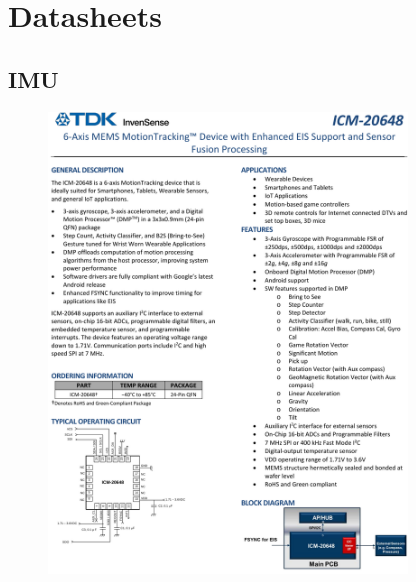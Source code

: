 \chapter{Datasheets}
\label{anexo:datasheets}

 \graphicspath{{Appendix1/Figuras/}{Appendix1/Figs/PDF/}{Appendix1/Figs/}}

\vspace{-10mm}
\section{IMU}
\begin{figure}[H]
\centering
\includegraphics[width=0.85\textwidth]{imu_1.pdf}
\end{figure}

\newpage

